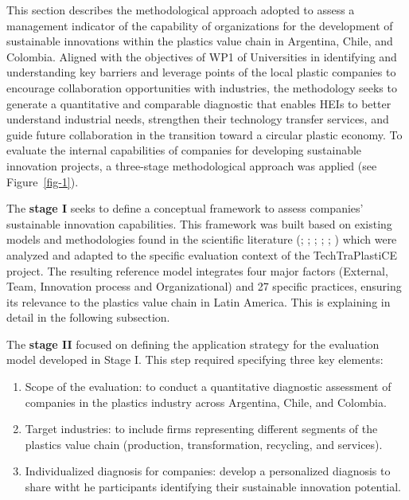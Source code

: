 \documentclass[
  12pt,
  oneside]{book}
\providecommand{\tightlist}{%
  \setlength{\itemsep}{0pt}\setlength{\parskip}{0pt}}
\begin{document}
This section describes the methodological approach adopted to assess a
management indicator of the capability of organizations for the
development of sustainable innovations within the plastics value chain
in Argentina, Chile, and Colombia. Aligned with the objectives of WP1 of
Universities in identifying and understanding key barriers and leverage
points of the local plastic companies to encourage collaboration
opportunities with industries, the methodology seeks to generate a
quantitative and comparable diagnostic that enables HEIs to better
understand industrial needs, strengthen their technology transfer
services, and guide future collaboration in the transition toward a
circular plastic economy. To evaluate the internal capabilities of
companies for developing sustainable innovation projects, a three-stage
methodological approach was applied (see Figure~\ref{fig-1}).

The \textbf{stage I} seeks to define a conceptual framework to assess
companies' sustainable innovation capabilities. This framework was built
based on existing models and methodologies found in the scientific
literature (;
;
;
;
;
) which were analyzed and
adapted to the specific evaluation context of the TechTraPlastiCE
project. The resulting reference model integrates four major factors
(External, Team, Innovation process and Organizational) and 27 specific
practices, ensuring its relevance to the plastics value chain in Latin
America. This is explaining in detail in the following subsection.

The \textbf{stage II} focused on defining the application strategy for
the evaluation model developed in Stage I. This step required specifying
three key elements:

\begin{enumerate}
\def\labelenumi{\arabic{enumi}.}
\tightlist
\item
  Scope of the evaluation: to conduct a quantitative diagnostic
  assessment of companies in the plastics industry across Argentina,
  Chile, and Colombia.
\item
  Target industries: to include firms representing different segments of
  the plastics value chain (production, transformation, recycling, and
  services).
\item
  Individualized diagnosis for companies: develop a personalized
  diagnosis to share witht he participants identifying their sustainable
  innovation potential.
\end{enumerate}
\end{document}

